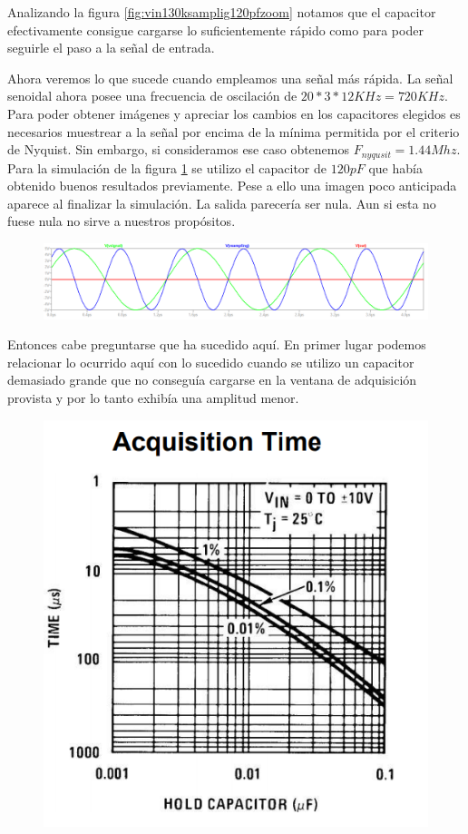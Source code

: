 Analizando la figura \ref{fig:vin130ksamplig120pfzoom} notamos que el capacitor efectivamente consigue cargarse lo suficientemente rápido como para poder seguirle el paso a la señal de entrada. 


Ahora veremos lo que sucede cuando empleamos una señal más rápida.
La señal senoidal ahora posee una frecuencia de oscilación de $20*3*12 KHz = 720KHz$. Para poder obtener imágenes y apreciar los cambios en los capacitores elegidos es necesarios muestrear a la señal por encima de la mínima permitida por el criterio de Nyquist. Sin embargo, si consideramos ese caso obtenemos  $F_{nyqusit}=1.44Mhz$.
Para la simulación de la  figura \ref{fig:vin21440ksamplign120pf} se utilizo el capacitor de $120pF$ que había obtenido buenos resultados previamente. Pese a ello una imagen poco anticipada aparece al finalizar la simulación. La salida parecería ser nula. Aun si esta no fuese nula no sirve a nuestros propósitos. 
\begin{figure}[H]
	\centering
	\includegraphics[width=\linewidth]{ImagenesEjercicio4/ChTests/Vin2_1440kSamplign120pF}
	\caption{}
	\label{fig:vin21440ksamplign120pf}
\end{figure}

Entonces cabe preguntarse que ha sucedido aquí. 
En primer lugar podemos relacionar lo ocurrido aquí con lo sucedido cuando se utilizo un capacitor demasiado grande que no conseguía cargarse en la ventana de adquisición provista y por lo tanto exhibía una amplitud menor.

\begin{figure}[H]
	\centering
	\includegraphics[scale=0.6]{ImagenesEjercicio4/HoldCapAcqTime}
	\caption{}
	\label{fig:holdcapacqtime}
\end{figure}

